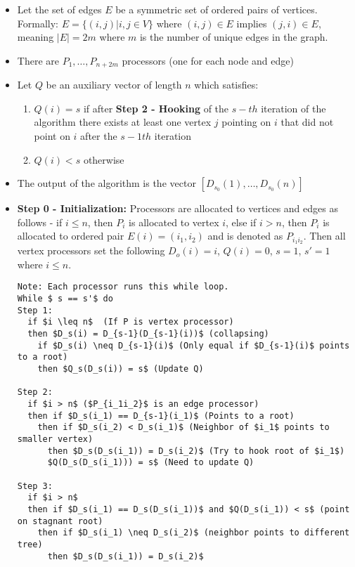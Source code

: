 \documentclass[a4paper]{article}
\begin{document}
\begin{itemize}
\begin{itemize}
\item Let the set of edges $E$ be a symmetric set of ordered pairs of vertices. Formally: $E = \{ (i, j) | i, j \in V \}$ where $(i, j) \in E$ implies $(j, i) \in E$, meaning $|E| = 2m$ where $m$ is the number of unique edges in the graph.

\item There are $P_1, \ldots, P_{n+2m}$ processors (one for each node and edge) 

\item Let $Q$ be an auxiliary vector of length $n$ which satisfies:
\begin{enumerate}
\item $Q(i) = s$ if after \textbf{Step 2 - Hooking}  of the $s-th$ iteration of the algorithm there exists at least one vertex $j$ pointing on $i$ that did not point on $i$ after the $s-1th$ iteration

\item $Q(i) < s$ otherwise
\end{enumerate}

\item The output of the algorithm is the vector $[D_{s_0}(1),\ldots,D_{s_0}(n)]$

\item \textbf{Step 0 - Initialization:} Processors are allocated to vertices and edges as follows - if $i \leq n$, then $P_i$ is allocated to vertex $i$, else if $i > n$, then $P_i$ is allocated to ordered pair $E(i) = (i_1, i_2)$ and is denoted as $P_{i_1i_2}$. Then all vertex processors set the following $D_o(i) = i$, $Q(i) = 0$, $s = 1$, $s' = 1$ where $i \leq n$.

\begin{lstlisting}
Note: Each processor runs this while loop.
While $ s == s'$ do
Step 1: 
  if $i \leq n$	 (If P is vertex processor)
  then $D_s(i) = D_{s-1}(D_{s-1}(i))$ (collapsing)
    if $D_s(i) \neq D_{s-1}(i)$ (Only equal if $D_{s-1}(i)$ points to a root) 
    then $Q_s(D_s(i)) = s$ (Update Q)
    
Step 2:
  if $i > n$ ($P_{i_1i_2}$ is an edge processor)
  then if $D_s(i_1) == D_{s-1}(i_1)$ (Points to a root)
    then if $D_s(i_2) < D_s(i_1)$ (Neighbor of $i_1$ points to smaller vertex)
      then $D_s(D_s(i_1)) = D_s(i_2)$ (Try to hook root of $i_1$)
      $Q(D_s(D_s(i_1))) = s$ (Need to update Q)
    
Step 3:
  if $i > n$
  then if $D_s(i_1) == D_s(D_s(i_1))$ and $Q(D_s(i_1)) < s$ (point on stagnant root)
    then if $D_s(i_1) \neq D_s(i_2)$ (neighbor points to different tree)
      then $D_s(D_s(i_1)) = D_s(i_2)$
      

\end{lstlisting}
\end{itemize}
\end{itemize}
\end{document}
